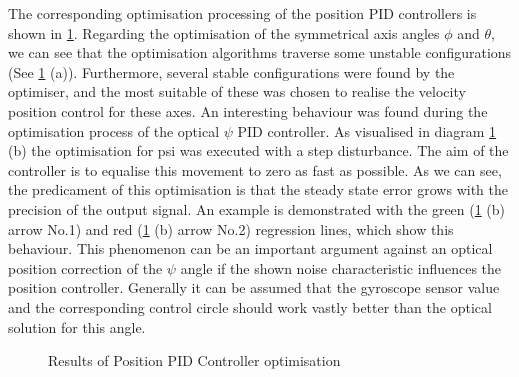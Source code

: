 The corresponding optimisation processing of the position \gls{PID} controllers is shown in \ref{fig:OptimisationPC_Phi_Theta_Psi}. 
Regarding the optimisation of the symmetrical axis angles \ensuremath{\phi} and \ensuremath{\theta}, we can see that the optimisation algorithms traverse some unstable configurations (See \ref{fig:OptimisationPC_Phi_Theta_Psi} (a)). Furthermore, several stable configurations were found by the optimiser, and the most suitable of these was chosen to realise the velocity position control for these axes. An interesting behaviour was found during the optimisation process of the optical \ensuremath{\psi} \gls{PID} controller. As visualised in diagram 
\ref{fig:OptimisationPC_Phi_Theta_Psi} (b)
the optimisation for psi was executed with a step disturbance. The aim of the controller is to equalise this movement  to zero as fast as possible. As we can see, the predicament of this optimisation is that the steady state error grows with the precision of the output signal. An example is demonstrated with the green (\ref{fig:OptimisationPC_Phi_Theta_Psi} (b) arrow No.1) and red 
(\ref{fig:OptimisationPC_Phi_Theta_Psi} (b) arrow No.2) regression lines, which show this behaviour. This phenomenon can be an important argument against an optical position correction of the \ensuremath{\psi} angle if the shown noise characteristic influences the position controller. Generally it can be assumed that the gyroscope sensor value and the corresponding control circle should work vastly better than the optical solution for this angle.
 
\begin{figure}[H]
\hfill
{}
\caption{Results of Position PID Controller optimisation} 
\label{fig:OptimisationPC_Phi_Theta_Psi}
\end{figure}


